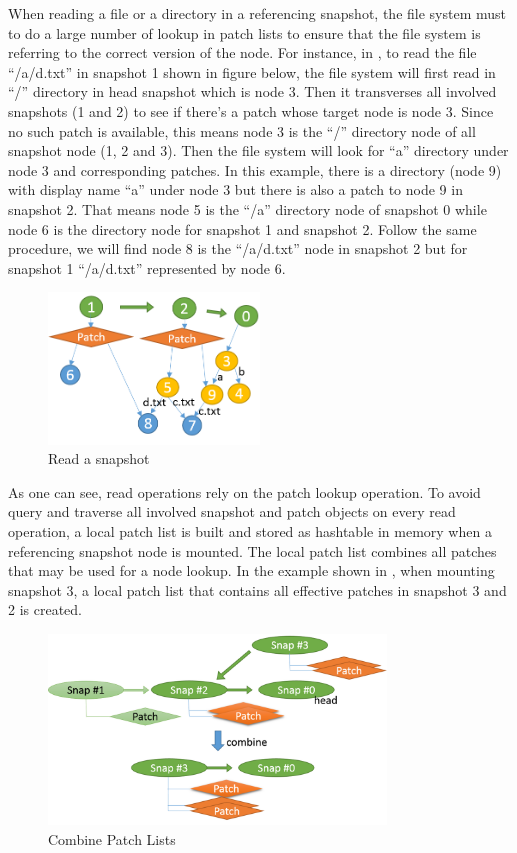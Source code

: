     When reading a file or a directory in a referencing snapshot, the file system must to do a large number of lookup in patch lists to ensure that the file system is referring to the correct version of the node. For instance, in  , to read the file ``/a/d.txt'' in snapshot 1 shown in figure below, the file system will first read in ``/'' directory in head snapshot which is node 3. Then it transverses all involved snapshots (1 and 2) to see if there's a patch whose target node is node 3. Since no such patch is available, this means node 3 is the ``/'' directory node of all snapshot node (1, 2 and 3). Then the file system will look for “a” directory under node 3 and corresponding patches. In this example, there is a directory (node 9) with display name “a” under node 3 but there is also a patch to node 9 in snapshot 2. That means node 5 is the ``/a'' directory node of snapshot 0 while node 6 is the directory node for snapshot 1 and snapshot 2. Follow the same procedure, we will find node 8 is the ``/a/d.txt'' node in snapshot 2 but for snapshot 1 ``/a/d.txt'' represented by node 6.

\begin{figure}[t]
\centering
\includegraphics[width=0.5\textwidth]{Chapter-4/figs/fig18.png}
\caption{Read a snapshot}
\label{fig:read_patches}
\end{figure}

    As one can see, read operations rely on the patch lookup operation. To avoid query and traverse all involved snapshot and patch objects on every read operation, a local patch list is built and stored as hashtable in memory when a referencing snapshot node is mounted. The local patch list combines all patches that may be used for a node lookup. In the example shown in , when mounting snapshot 3, a local patch list that contains all effective patches in snapshot 3 and 2 is created.

\begin{figure}[t]
\centering
\includegraphics[width=0.8\textwidth]{Chapter-4/figs/fig15.png}
\caption{Combine Patch Lists}
\label{fig:combine_patch_list}
\end{figure}

